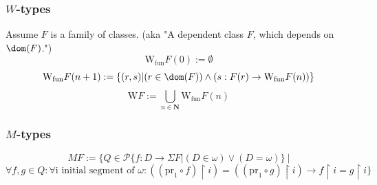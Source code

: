 \begin{theorem}

\end{theorem}



\subsubsection{$W$-types}
Assume $F$ is a family of classes. (aka "A dependent class $F$, which depends on $\dom(F)$.")
\[
\mbox{W}_{\mathrm{fun}}F(0):= \emptyset 
\]
\[
\mbox{W}_{\mathrm{fun}}F(n+1):= \{(r,s)| (r\in \dom(F))\land (s:F(r)\to \mbox{W}_{\mathrm{fun}}F(n) )\}
\]
\[
\mbox{W}F :=\bigcup_{n\in\textbf{N}} \mbox{W}_{\mathrm{fun}}F(n)
\]
\subsubsection{$M$-types}
\[
MF := \{Q\in\mathcal{P}\{f:D \to\Sigma F| (D\in\omega)\lor(D=\omega)\}\ | 
\]
\[
\forall f,g\in Q: \forall \mbox{i initial segment of }\omega: ((\mathrm{pr}_1 \circ f)\restriction i)=((\mathrm{pr}_1 \circ g) \restriction i) \longrightarrow f \restriction i =  g \restriction i\}
\]

